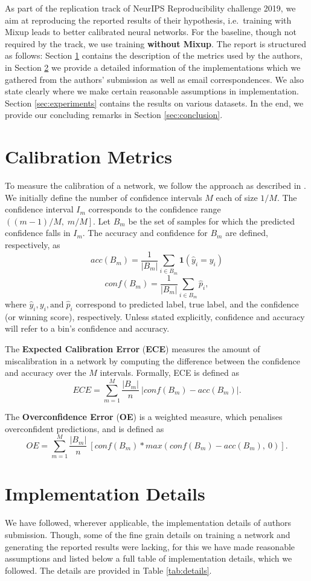 As part of the replication track of NeurIPS Reproducibility challenge 2019, we aim at reproducing the reported results of their hypothesis, i.e.\ training with Mixup leads to better calibrated neural networks. For the baseline, though not required by the track, we use training \textbf{without Mixup}. The report is structured as follows: Section \ref{sec:metrics} contains the description of the metrics used by the authors, in Section \ref{sec:implementation} we provide a detailed information of the implementations which we gathered from the authors' submission as well as email correspondences. We also state clearly where we make certain reasonable assumptions in implementation. Section \ref{sec:experiments} contains the results on various datasets. In the end, we provide our concluding remarks in Section \ref{sec:conclusion}.


\section{Calibration Metrics}
\label{sec:metrics}
To measure the calibration of a network, we follow the approach as described in \cite{calibration}. 
We initially define the number of confidence intervals $M$ each of size $1/M$. The confidence interval $I_m$ corresponds to the confidence range $\left((m-1)/M,\; m/M\right]$. Let $B_m$ be the set of samples for which the predicted confidence falls in $I_m$. The accuracy and confidence for $B_m$ are defined, respectively, as
\[ acc(B_m) = \frac{1}{|B_m|} \sum_{i \in B_m}\bm{1}(\hat{y}_i = y_i) \]
\[ conf(B_m) = \frac{1}{|B_m|} \sum_{i \in B_m}\hat{p}_i, \]
where $\hat{y}_i, y_i, \text{and}\; \hat{p}_i $ correspond to predicted label, true label, and the confidence (or winning score), respectively. Unless stated explicitly, confidence and accuracy will refer to a bin's confidence and accuracy.

The \textbf{Expected Calibration Error} (\textbf{ECE}) measures the amount of miscalibration in a network by computing the difference between the confidence and accuracy over the $M$ intervals. Formally, ECE is defined as
\[ ECE = \sum_{m=1}^{M} \frac{|B_m|}{n} \: \Big| conf(B_m) - acc(B_m)\Big|. \]

The \textbf{Overconfidence Error} (\textbf{OE}) is a weighted measure, which penalises overconfident predictions, and is defined as
\[ OE = \sum_{m=1}^{M} \frac{|B_m|}{n} \: \left[ conf(B_m) *max\left(conf(B_m)-acc(B_m),\: 0\right) \right]. \]


\section{Implementation Details}
\label{sec:implementation}
We have followed, wherever applicable, the implementation details of authors submission. Though, some of the fine grain details on training a network and generating the reported results were lacking, for this we have made reasonable assumptions and listed below a full table of implementation details, which we followed. The details are provided in Table \ref{tab:details}.

